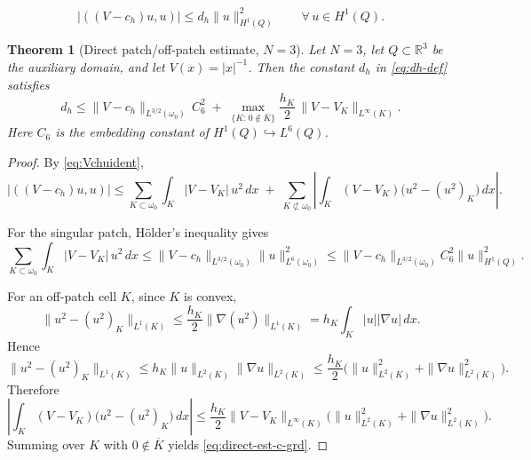 \documentclass[10pt,a4paper]{amsart}
\newtheorem{theorem}{Theorem}
\begin{document}
\begin{equation}
|((V-c_h)u,u)| \le d_h \|u\|_{H^1(Q)}^2
\qquad \forall\,u\in H^1(Q).
\label{eq:dh-def}
\end{equation}

\begin{theorem}[Direct patch/off-patch estimate, $N=3$]
\label{thm:graded-eps}
Let $N=3$, let $Q\subset \mathbb R^3$ be the auxiliary domain, and let
$V(x)=|x|^{-1}$. Then the constant $d_h$ in \eqref{eq:dh-def} satisfies
\begin{equation}
d_h
\le
\|V-c_h\|_{L^{3/2}(\omega_0)}\,C_6^2
\;+\;
\max_{\{K:\,0\notin \overline K\}}
\frac{h_K}{2}\,\|V-V_K\|_{L^\infty(K)}.
\label{eq:direct-est-c-grd}
\end{equation}
Here $C_6$ is the embedding constant of
$H^1(Q)\hookrightarrow L^6(Q)$.
\end{theorem}

\begin{proof}
By \eqref{eq:Vchuident},
\[
|((V-c_h)u,u)|
\le
\sum_{K\subset \omega_0}\int_K |V-V_K|\,u^2\,dx
\;+\;
\sum_{K\not\subset \omega_0}
\left|\int_K (V-V_K)\bigl(u^2-(u^2)_K\bigr)\,dx\right|.
\]

For the singular patch, Hölder's inequality gives
\[
\sum_{K\subset \omega_0}\int_K |V-V_K|\,u^2\,dx
\le
\|V-c_h\|_{L^{3/2}(\omega_0)} \|u\|_{L^6(\omega_0)}^2
\le
\|V-c_h\|_{L^{3/2}(\omega_0)} C_6^2 \|u\|_{H^1(Q)}^2.
\]

For an off-patch cell $K$, since $K$ is convex,
\[
\|u^2-(u^2)_K\|_{L^1(K)}
\le
\frac{h_K}{2}\|\nabla(u^2)\|_{L^1(K)}
=
h_K\int_K |u||\nabla u|\,dx.
\]
Hence
\[
\|u^2-(u^2)_K\|_{L^1(K)}
\le
h_K \|u\|_{L^2(K)}\|\nabla u\|_{L^2(K)}
\le
\frac{h_K}{2}\bigl(\|u\|_{L^2(K)}^2+\|\nabla u\|_{L^2(K)}^2\bigr).
\]
Therefore
\[
\left|\int_K (V-V_K)\bigl(u^2-(u^2)_K\bigr)\,dx\right|
\le
\frac{h_K}{2}\|V-V_K\|_{L^\infty(K)}
\bigl(\|u\|_{L^2(K)}^2+\|\nabla u\|_{L^2(K)}^2\bigr).
\]
Summing over $K$ with $0\notin \overline K$ yields \eqref{eq:direct-est-c-grd}.
\end{proof}
\end{document}
